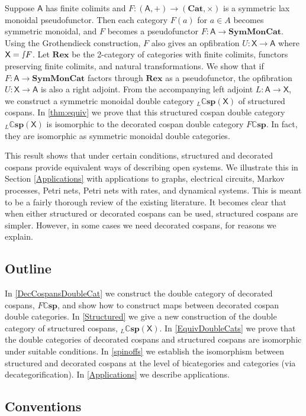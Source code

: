 \documentclass[ a4paper, onecolumn, superscriptaddress,10pt, accepted=2022-02-14, issue=3, volume=4, shorttitle=papers/compositionality-4-3 ]{compositionalityarticle}
\let\maps\colon
\newcommand{\A}{\mathsf{A}}
\newcommand{\X}{\mathsf{X}}
\newcommand{\bicat}{\mathbf}
\newcommand{\Cat}{\bicat{Cat}}
\newcommand{\Rex}{\bicat{Rex}}
\newcommand{\SMC}{\bicat{SymMonCat}}
\newcommand{\double}[1]{\mathbf{\mathbb #1}}
\newcommand{\lCsp}{\double{Csp}}
\newcommand{\inta}{\raisebox{.3\depth}{$\smallint\hspace{-.01in}$}}
\begin{document}
Suppose $\A$ has finite colimits and $F \maps (\A , +) \to (\Cat, \times)$ is a symmetric lax monoidal pseudofunctor.  Then each category $F(a)$ for $a \in A$ becomes symmetric monoidal, and $F$ becomes a pseudofunctor $F \maps \A \to \SMC$.    Using the Grothendieck construction, $F$ also gives an opfibration $U \maps \X \to \A$ where $\X = \inta F$.   Let $\Rex$ be the 2-category of categories with finite colimits, functors preserving finite colimits, and natural transformations.  We show that if $F \maps \A \to \SMC$ factors through $\Rex$ as a pseudofunctor, the opfibration $U \maps \X \to \A$ is also a right adjoint.   From the accompanying left adjoint $L \maps \A \to \X$, we  construct a symmetric monoidal double category ${}_L \lCsp(\X)$ of structured cospans.  In \cref{thm:equiv} we prove that this structured cospan double category ${}_L \lCsp(\X)$ is isomorphic to the decorated cospan double category $F \lCsp$.   In fact, they are isomorphic as symmetric monoidal double categories.

This result shows that under certain conditions, structured and decorated cospans provide equivalent ways of describing open systems.  We illustrate this in Section \ref{Applications} with applications to graphs, electrical circuits, Markov processes, Petri nets, Petri nets with rates, and dynamical systems.   This is meant to be a fairly thorough review of the existing literature.   It becomes clear that when either structured or decorated cospans can be used, structured cospans are simpler.  However, in some cases we need decorated cospans, for reasons we explain.

\subsection*{Outline}

In \cref{DecCospansDoubleCat} we construct the double category of decorated cospans, $F\lCsp$, and show how to construct maps between decorated cospan double categories. In \cref{Structured} we give a new construction of the double category of structured cospans, ${}_L \lCsp(\X)$.  In \cref{EquivDoubleCats} we prove that the double categories of decorated cospans and structured cospans are isomorphic under suitable conditions.  In \cref{spinoffs} we establish the isomorphism between structured and decorated cospans at the level of bicategories and categories (via decategorification).  In \cref{Applications} we describe applications.

\subsection*{Conventions}
\end{document}
